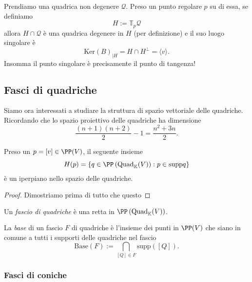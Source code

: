 \documentclass[11pt]{scrartcl}
\renewcommand{\ker}[1]{\text{Ker}\left(#1\right)}
\newcommand{\KK}{\mathbb{K}}
\begin{document}
	\begin{example}
		Prendiamo una quadrica non degenere $\mathcal{Q}$. Preso un punto regolare $p$ su di essa, se definiamo
		$$H:=\mathbb{T}_p\mathcal{Q}$$
		allora $H\cap \mathcal{Q}$ è una quadrica degenere in $H$ (per definizione) e il suo luogo singolare è
		$$\ker{B}_{\mid H}=H\cap H^\perp = \langle v \rangle.$$
		Insomma il punto singolare è precisamente il punto di tangenza! 
	\end{example}	
	
	\subsection{Fasci di quadriche}
	Siamo ora interessati a studiare la struttura di spazio vettoriale delle quadriche. Ricordando che lo spazio proiettivo delle quadriche ha dimensione 
	$$\frac{(n+1)(n+2)}{2}-1=\frac{n^2+3n}{2}.$$
	\begin{lemma}
		Preso un $p=[v]\in \PP(V)$, il seguente insieme 
		$$H(p)=\left\{q\in \PP\left(\text{Quad}_\KK(V)\right):p\in \text{supp}q\right\}$$
		è un iperpiano nello spazio delle quadriche.
	\end{lemma}
	\begin{proof}
		Dimostriamo prima di tutto che questo  
	\end{proof}
	\begin{definition}
		Un \textit{fascio di quadriche} è una retta in $\PP\left(\text{Quad}_\KK(V)\right)$.
	\end{definition}
	\begin{definition}
		La \textit{base} di un fascio $F$ di quadriche è l'insieme dei punti in $\PP(V)$ che siano in comune a tutti i supporti delle quadriche nel fascio
		$$\text{Base}(F):=\bigcap_{[Q]\in F}\text{supp}([Q]).$$
	\end{definition}
	
	\subsubsection{Fasci di coniche}
	
\end{document}
